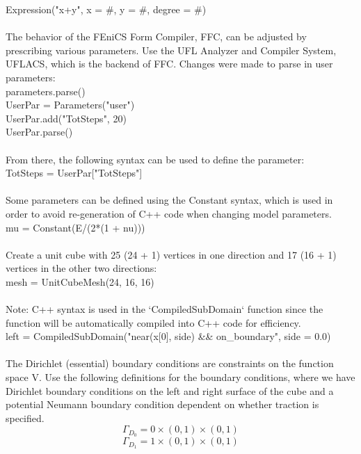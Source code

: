 \documentclass[12pt,3p]{article}
\begin{document}
{\selectfont 
Expression("x+y", x = \#, y = \#, degree = \#) \\ \\
} 
The behavior of the FEniCS Form Compiler, FFC, can be adjusted by prescribing various parameters. Use the UFL Analyzer and Compiler System, UFLACS, which is the backend of FFC. Changes were made to parse in user parameters: \\
{\selectfont
parameters.parse() \\
UserPar = Parameters("user") \\
UserPar.add("TotSteps", 20) \\
UserPar.parse() \\ \\
}
From there, the following syntax can be used to define the parameter: \\
{\selectfont
TotSteps = UserPar["TotSteps"]   \\ \\
}
Some parameters can be defined using the {\selectfont Constant } syntax, which is used in order to avoid re-generation of C++ code when changing model parameters. \\
{\selectfont
mu = Constant(E/(2*(1 + nu))) \\ \\
}
Create a unit cube with 25 (24 + 1) vertices in one direction and 17 (16 + 1) vertices in the other two directions: \\
{\selectfont
mesh = UnitCubeMesh(24, 16, 16) \\ \\
}
Note: C++ syntax is used in the `CompiledSubDomain` function since the function will be automatically compiled into C++ code for efficiency. \\ 
{\selectfont
left =  CompiledSubDomain("near(x[0], side) \&\& on\_boundary", side = 0.0) \\ \\
}
The Dirichlet (essential) boundary conditions are constraints on the function space V. Use the following definitions for the boundary conditions, where we have Dirichlet boundary conditions on the left and right surface of the cube and a potential Neumann boundary condition dependent on whether traction is specified.
\[ \Gamma_{D_0} = 0 \times (0,1) \times (0,1) \]
\[ \Gamma_{D_1} = 1 \times (0,1) \times (0,1) \]


\end{document}

